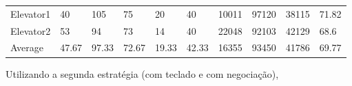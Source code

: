 \documentclass[a4paper]{article}
\begin{document}
\begin{table}[h]
\begin{tabular}{@{}llllllllll@{}}
Elevator1 & 40        & 105            & 75           & 20                                                               & 40                                                                  & 10011                                                         & 97120                                                 & 38115                                                   & 71.82        \\
Elevator2 & 53       & 94            & 73           & 14                                                               & 40                                                                  & 22048                                                         & 92103                                                 & 42129                                                   & 68.6         \\
Average   & 47.67     & 97.33         & 72.67        & 19.33                                                               & 42.33                                                               & 16355                                                         & 93450                                                 &   41786                                                 & 69.77         \\ \bottomrule
\end{tabular}
\end{table}

\newpage

Utilizando a segunda estratégia (com teclado e com negociação),
\end{document}
